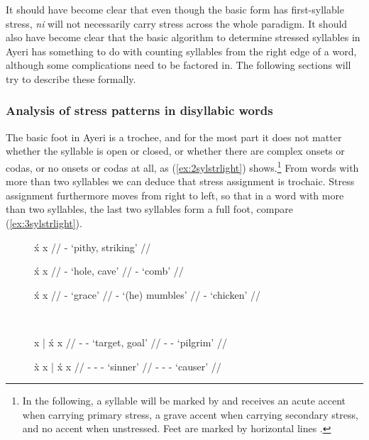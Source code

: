 It should have become clear that even though the basic form 
has first-syllable stress, \textit{ni} will not necessarily carry stress across
the whole paradigm. It should also have become clear that the basic algorithm
to determine stressed syllables in Ayeri has something to do with counting
syllables from the right edge of a word, although some complications need to be
factored in. The following sections will try to describe these formally.

\subsubsection{Analysis of stress patterns in disyllabic words}

The basic foot in Ayeri is a trochee, and for the most part it does not matter
whether the syllable is open or closed, or whether there are complex onsets or
codas, or no onsets or codas at all, as (\ref{ex:2sylstrlight})
shows.\footnote{In the following, a syllable will be marked by  and
receives an acute accent  when carrying primary stress, a grave accent
\orth{\`{}} when carrying secondary stress, and no accent when unstressed. Feet
are marked by horizontal lines \orth{|}.\label{fn:scansion}} From words with
more than two syllables we can deduce that stress assignment is trochaic.
Stress assignment furthermore moves from right to left, so that in a word with
more than two syllables, the last two syllables form a full foot, compare
(\ref{ex:3sylstrlight}).

\begin{figure}
\begin{minipage}[t]{.5\linewidth}
\pex[everygla=\upshape]\label{ex:2sylstrlight}
\a\begingl
	\gla x́		{}	x	{} //
	\glb {}	-	 {`pithy, striking'} //
\endgl

\a\begingl
	\gla x́		{}	x		{} //
	\glb {}	-		{`hole, cave'} //
	\glb {}	-			{`comb'} //
\endgl

\a\begingl
	\gla x́		{}	x		{} //
	\glb {}	-			{`grace'} //
	\glb {}	-		{`(he) mumbles'} //
	\glb {}	-			{`chicken'} //
\endgl
\xe
\end{minipage}
~
\begin{minipage}[t]{.5\linewidth}
\pex[everygla=\upshape]\label{ex:3sylstrlight}
\a\begingl
	\gla x		|	x́		{}	x	 	{} //
	\glb {}	-			-		
{`target, goal'} //
	\glb {}	-			-			
{`pilgrim'} //
\endgl

\a\label{ex:4sylstress}\begingl
	\gla x̀		{}	x		|	x́		{}	
x		{} //
	\glb {}	-			-			-	
		{`sinner'} //
	\glb {}	-			-			-	
		{`causer'} //
\endgl
\xe
\end{minipage}
\end{figure}

